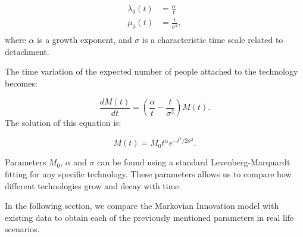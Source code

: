 \begin{equation}
    \begin{aligned}
        \lambda_0(t)&=\frac{\alpha}{t}\\
        \mu_0(t)&=\frac{t}{\sigma^2},\\
    \end{aligned}
\end{equation}
where $\alpha$ is a growth exponent, and $\sigma$ is a characteristic time scale related to detachment. 

The time variation of the expected number of people attached to the technology becomes:

\begin{equation}
    \frac{dM(t)}{dt} = \left(\frac{\alpha}{t}-\frac{t}{\sigma^2}\right)M(t).
\end{equation}
The solution of this equation is:

\begin{equation}
    M(t)=M_0t^\alpha e^{-t^2/2\sigma^2}.
    \label{eq:number_of_attachments_over_time}
\end{equation}

Parameters $M_0$, $\alpha$ and $\sigma$ can be found using a standard Levenberg-Marquardt fitting for any specific technology. These parameters allows us to compare how different technologies grow and decay with time.

In the following section, we compare the Markovian Innovation model with existing data to obtain each of the previously mentioned parameters in real life scenarios.

